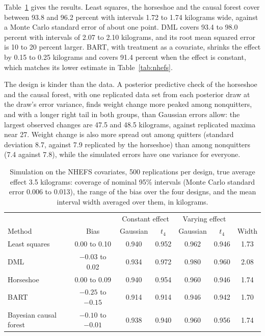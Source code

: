 Table~\ref{tab:nhefssim} gives the results. Least squares, the horseshoe and the causal forest cover between 93.8 and 96.2 percent with intervals 1.72 to 1.74 kilograms wide, against a Monte Carlo standard error of about one point. DML covers 93.4 to 98.0 percent with intervals of 2.07 to 2.10 kilograms, and its root mean squared error is 10 to 20 percent larger. BART, with treatment as a covariate, shrinks the effect by 0.15 to 0.25 kilograms and covers 91.4 percent when the effect is constant, which matches its lower estimate in Table~\ref{tab:nhefs}.

The design is kinder than the data. A posterior predictive check of the horseshoe and the causal forest, with one replicated data set from each posterior draw at the draw's error variance, finds weight change more peaked among nonquitters, and with a longer right tail in both groups, than Gaussian errors allow: the largest observed changes are 47.5 and 48.5 kilograms, against replicated maxima near 27. Weight change is also more spread out among quitters (standard deviation 8.7, against 7.9 replicated by the horseshoe) than among nonquitters (7.4 against 7.8), while the simulated errors have one variance for everyone.

\begin{table}[ht]
\centering
\caption{Simulation on the NHEFS covariates, 500 replications per design, true average effect 3.5 kilograms: coverage of nominal 95\% intervals (Monte Carlo standard error 0.006 to 0.013), the range of the bias over the four designs, and the mean interval width averaged over them, in kilograms.}
\label{tab:nhefssim}
\footnotesize
\setlength{\tabcolsep}{4pt}
\begin{tabular}{lcccccc}
\toprule
 & & \multicolumn{2}{c}{Constant effect} & \multicolumn{2}{c}{Varying effect} & \\
Method & Bias & Gaussian & $t_4$ & Gaussian & $t_4$ & Width \\
\midrule
Least squares & 0.00 to 0.10 & 0.940 & 0.952 & 0.962 & 0.946 & 1.73 \\
DML & $-0.03$ to 0.02 & 0.934 & 0.972 & 0.980 & 0.960 & 2.08 \\
Horseshoe & 0.00 to 0.09 & 0.940 & 0.954 & 0.960 & 0.946 & 1.74 \\
BART & $-0.25$ to $-0.15$ & 0.914 & 0.914 & 0.946 & 0.942 & 1.70 \\
Bayesian causal forest & $-0.10$ to $-0.01$ & 0.938 & 0.940 & 0.960 & 0.956 & 1.74 \\
\bottomrule
\end{tabular}
\end{table}

